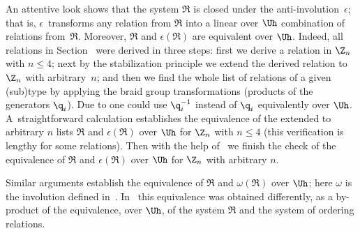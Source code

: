 \begin{remark}
An attentive look shows that the system $\mathfrak{R}$ is closed under the anti-involution~$\epsilon$; that is, $\epsilon$~transforms any
relation from $\mathfrak{R}$ into a linear over $\Uh$ combination of relations from~$\mathfrak{R}$. Moreover, $\mathfrak{R}$ and
$\epsilon (\mathfrak{R})$ are equivalent over $\Uh$. Indeed, all relations in Section~ were derived in
three steps: f\/irst we derive a relation in $\Z_n$ with $n\leq 4$; next by the stabilization principle we extend the derived relation
to~$\Z_n$ with arbitrary~$n$;
and then we f\/ind the whole list of relations of a given (sub)type by applying the braid group transformations (products of the
generators $\q_i$). Due to  one could use $\q_i^{-1}$ instead of $\q_i$ equivalently over
$\Uh$. A~straightforward calculation establishes the equivalence of the extended to arbitrary $n$ lists $\mathfrak{R}$ and
$\epsilon (\mathfrak{R})$ over $\Uh$ for $\Z_n$ with
$n\leq 4$ (this verif\/ication is lengthy for some relations).
Then with the help of~ we f\/inish the check of the equivalence of $\mathfrak{R}$ and $\epsilon (\mathfrak{R})$ over $\Uh$ for $\Z_n$ with
arbitrary $n$.


Similar arguments establish  the equivalence of $\mathfrak{R}$ and $\omega (\mathfrak{R})$ over $\Uh$; here $\omega$ is the involution def\/ined
in~. In~\cite{KO3} this equivalence was obtained dif\/ferently, as a by-product of the equivalence, over $\Uh$, of the system $\mathfrak{R}$ and
the system   of ordering relations.
\end{remark}
